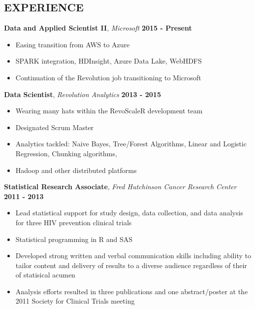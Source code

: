 \documentclass{res}
\begin{document}
\address{801 17th Ave\\Seattle, WA 98122} 
\address{\textit{T:} (734) 754-6020\\\textit{Email:} casey.m.herron@gmail.com}
\begin{resume}

\section{EXPERIENCE}
\vspace*{+0.2cm}
\textbf{Data and Applied Scientist II}, \textit{Microsoft} \hfill \textbf{2015 - Present}
\begin{itemize} \itemsep -2pt
\item Easing transition from AWS to Azure
\item SPARK integration, HDInsight, Azure Data Lake, WebHDFS
\item Continuation of the Revolution job transitioning to Microsoft
\end{itemize}

\textbf{Data Scientist}, \textit{Revolution Analytics} \hfill \textbf{2013 - 2015}
\begin{itemize} \itemsep -2pt
\item Wearing many hats within the RevoScaleR development team
\item Designated Scrum Master
\item Analytics tackled: Naive Bayes, Tree/Forest Algorithms, Linear and Logistic Regression, Chunking algorithms,
\item Hadoop and other distributed platforms 
\end{itemize}

\textbf{Statistical Research Associate}, \textit{Fred Hutchinson Cancer Research Center} \hfill \textbf{2011 - 2013}%
\begin{itemize} \itemsep -2pt
\item Lead statistical support for study design, data collection, and data analysis for three HIV prevention clinical trials
\item Statistical programming in R and SAS
\item Developed strong written and verbal communication skills including ability to tailor content and delivery of results to a diverse audience regardless of their of statisical acumen
\item Analysis efforts resulted in three publications and one abstract/poster at the 2011 Society for Clinical Trials meeting
\end{itemize}


\end{resume}
\end{document}
